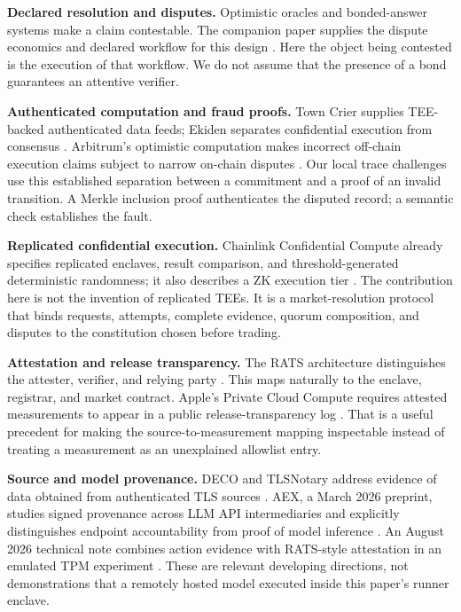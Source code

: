 \textbf{Declared resolution and disputes.} Optimistic oracles and bonded-answer systems make a claim contestable. The companion paper supplies the dispute economics and declared workflow for this design \cite{trustexplicit2026}. Here the object being contested is the execution of that workflow. We do not assume that the presence of a bond guarantees an attentive verifier.

\textbf{Authenticated computation and fraud proofs.} Town Crier supplies TEE-backed authenticated data feeds; Ekiden separates confidential execution from consensus \cite{towncrier2016,ekiden2019}. Arbitrum's optimistic computation makes incorrect off-chain execution claims subject to narrow on-chain disputes \cite{arbitrum2018}. Our local trace challenges use this established separation between a commitment and a proof of an invalid transition. A Merkle inclusion proof authenticates the disputed record; a semantic check establishes the fault.

\textbf{Replicated confidential execution.} Chainlink Confidential Compute already specifies replicated enclaves, result comparison, and threshold-generated deterministic randomness; it also describes a ZK execution tier \cite{chainlinkcc}. The contribution here is not the invention of replicated TEEs. It is a market-resolution protocol that binds requests, attempts, complete evidence, quorum composition, and disputes to the constitution chosen before trading.

\textbf{Attestation and release transparency.} The RATS architecture distinguishes the attester, verifier, and relying party \cite{rats2023}. This maps naturally to the enclave, registrar, and market contract. Apple's Private Cloud Compute requires attested measurements to appear in a public release-transparency log \cite{pcc2026}. That is a useful precedent for making the source-to-measurement mapping inspectable instead of treating a measurement as an unexplained allowlist entry.

\textbf{Source and model provenance.} DECO and TLSNotary address evidence of data obtained from authenticated TLS sources \cite{deco2020,tlsnotary}. AEX, a March 2026 preprint, studies signed provenance across LLM API intermediaries and explicitly distinguishes endpoint accountability from proof of model inference \cite{aex2026}. An August 2026 technical note combines action evidence with RATS-style attestation in an emulated TPM experiment \cite{aep2026}. These are relevant developing directions, not demonstrations that a remotely hosted model executed inside this paper's runner enclave.

